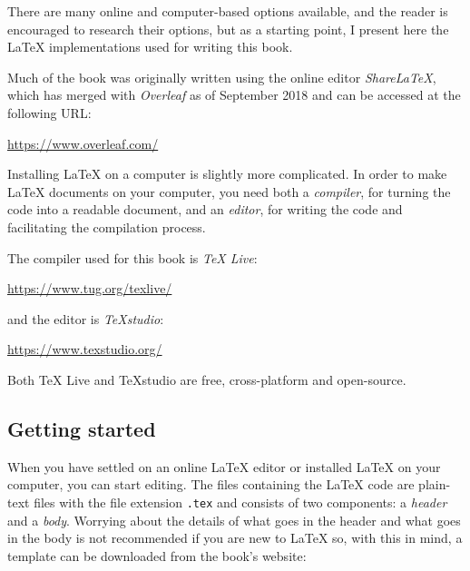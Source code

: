 There are many online and computer-based options available, and the reader is encouraged to research their options, but as a starting point, I present here the \LaTeX{} implementations used for writing this book.

Much of the book was originally written using the online editor \textit{ShareLaTeX}, which has merged with \textit{Overleaf} as of September 2018 and can be accessed at the following URL:

\vspace{-15pt}
\begin{center}
\url{https://www.overleaf.com/}
\end{center}

\vspace{-15pt}
Installing \LaTeX{} on a computer is slightly more complicated. In order to make \LaTeX{} documents on your computer, you need both a \textit{compiler}, for turning the code into a readable document, and an \textit{editor}, for writing the code and facilitating the compilation process.

The compiler used for this book is \textit{TeX Live}:

\vspace{-15pt}
\begin{center}
\url{https://www.tug.org/texlive/}
\end{center}

\vspace{-15pt}
and the editor is \textit{TeXstudio}:

\vspace{-15pt}
\begin{center}
\url{https://www.texstudio.org/}
\end{center}

\vspace{-15pt}
Both TeX Live and TeXstudio are free, cross-platform and open-source.

\subsection*{Getting started}

When you have settled on an online \LaTeX{} editor or installed \LaTeX{} on your computer, you can start editing. The files containing the \LaTeX{} code are plain-text files with the file extension \texttt{.tex} and consists of two components: a \textit{header} and a \textit{body}. Worrying about the details of what goes in the header and what goes in the body is not recommended if you are new to \LaTeX{} so, with this in mind, a template can be downloaded from the book's website:

